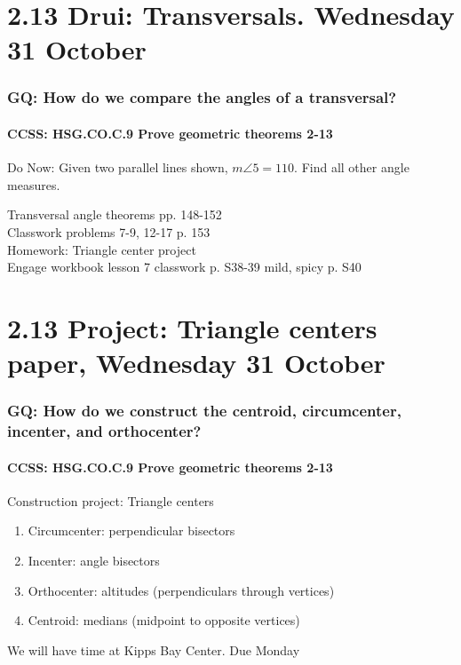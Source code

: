 \documentclass{beamer}
\begin{document}
\section{2.13 Drui: Transversals. Wednesday 31 October}
  \frame
  {
    \frametitle{GQ: How do we compare the angles of a transversal?}
    \framesubtitle{CCSS: HSG.CO.C.9 Prove geometric theorems  \alert{2-13}}

    \begin{block}{Do Now: Given two parallel lines shown, $m\angle 5=110$. Find all other angle measures.}
    \begin{enumerate}
      \begin{center}
      \end{center}    \end{enumerate}
    \end{block}
    Transversal angle theorems pp. 148-152\\
    Classwork problems 7-9, 12-17 p. 153\\
    \vspace{0.2cm}
    Homework: Triangle center project\\
    Engage workbook lesson 7 classwork p. S38-39 mild, spicy p. S40
  }

\section{2.13 Project: Triangle centers paper, Wednesday 31 October}
  \frame
  {
    \frametitle{GQ: How do we construct the centroid, circumcenter, incenter, and orthocenter?}
    \framesubtitle{CCSS: HSG.CO.C.9 Prove geometric theorems  \alert{2-13}}

    \begin{block}{Construction project: Triangle centers}
    \begin{enumerate}
        \item Circumcenter: perpendicular bisectors
        \item Incenter: angle bisectors
        \item Orthocenter: altitudes (perpendiculars through vertices)
        \item Centroid: medians (midpoint to opposite vertices)
    \end{enumerate}
    \end{block}
    We will have time at Kipps Bay Center. Due Monday
  }
\end{document}
